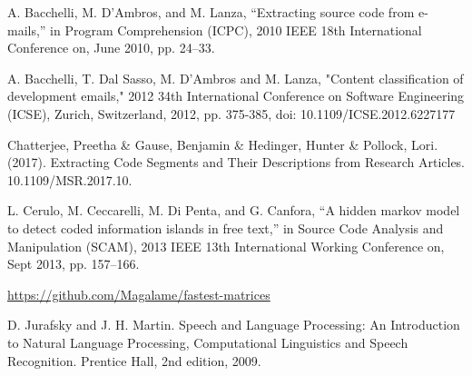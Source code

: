 \documentclass[12pt]{scrreprt}
\begin{document}
\begin{thebibliography}{9}

    A. Bacchelli, M. D’Ambros, and M. Lanza, “Extracting source code from e-mails,” in Program Comprehension (ICPC), 2010 IEEE 18th International Conference on, June 2010, pp. 24–33.

    A. Bacchelli, T. Dal Sasso, M. D'Ambros and M. Lanza, "Content classification of development emails," 2012 34th International Conference on Software Engineering (ICSE), Zurich, Switzerland, 2012, pp. 375-385, doi: 10.1109/ICSE.2012.6227177

    Chatterjee, Preetha \& Gause, Benjamin \& Hedinger, Hunter \& Pollock, Lori. (2017). Extracting Code Segments and Their Descriptions from Research Articles. 10.1109/MSR.2017.10. 

    L. Cerulo, M. Ceccarelli, M. Di Penta, and G. Canfora, “A hidden markov model to detect coded information islands in free text,” in Source Code Analysis and Manipulation (SCAM), 2013 IEEE 13th International Working Conference on, Sept 2013, pp. 157–166.

    \href{https://github.com/Magalame/fastest-matrices}{https://github.com/Magalame/fastest-matrices}

    D. Jurafsky and J. H. Martin. Speech and Language Processing: An Introduction to Natural Language Processing, Computational Linguistics and Speech Recognition. Prentice Hall, 2nd edition, 2009.

\end{thebibliography}
\end{document}
